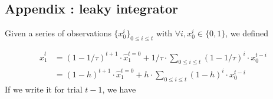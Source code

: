 \documentclass[10pt,letterpaper]{article}
\newcommand{\eq}[1]{\begin{equation*}#1\end{equation*}}
\newcommand{\eqs}[1]{\begin{align*}#1\end{align*}}
\newcommand{\ms}{\si{\milli\second}}%
\newcommand{\citep}[1]{\cite{#1}}
\newcommand{\seeFig}[1]{Figure~\ref{fig:#1}}
\begin{document}
%
%
%
%
%

\subsection{Appendix : leaky integrator}
\label{app:leaky}
Given a series of observations $\{x_0^i\}_{0\leq i \leq t}$
with $\forall i, x_0^i \in \{0, 1 \}$, we defined

\eqs{
\hat{x}_1^{t} &= (1-1/\tau)^{t+1} \cdot \hat{x}_1^{t=0} + 1/\tau \cdot \sum_{0\leq i \leq t} (1 - 1/\tau)^{i} \cdot x_0^{t-i}\\
			  &= (1-h)^{t+1} \cdot \hat{x}_1^{t=0} + h \cdot \sum_{0\leq i \leq t} (1 - h)^{i} \cdot x_0^{t-i}
}
If we write it for trial $t-1$, we have
\end{document}
